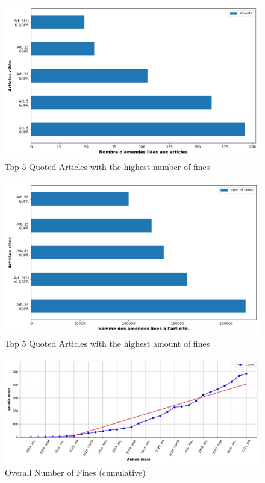 \documentclass[12pt]{article}
\begin{document}
	\begin{multicols}{2}
	\begin{figure}
		[H]\centering\includegraphics[width=1\linewidth]{graphs/top10_quoted} 
		\caption{Top 5 Quoted Articles with the highest number of fines}
	\end{figure}
	\begin{figure}
		[H]\centering\includegraphics[width=1\linewidth]{graphs/top10_quoted_fines} 
		\caption{Top 5  Quoted Articles with the highest amount of fines}
	\end{figure}
	\end{multicols}
	
	
	\begin{figure}
		[H]\centering\includegraphics[width=0.8\linewidth]{graphs/acc_nb_cases_graph}
		\caption{Overall Number of Fines (cumulative) }
	\end{figure}
	
\end{document}
